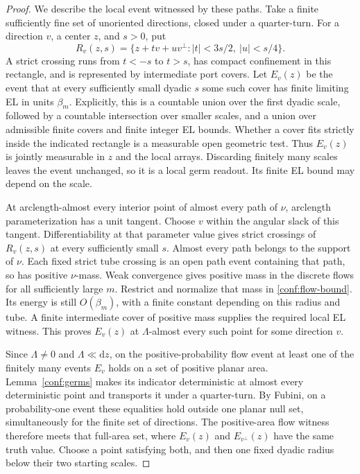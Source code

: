 \documentclass[11pt]{article}
\numberwithin{equation}{section}
\theoremstyle{definition}
\theoremstyle{remark}
\newcommand{\dd}{\mathrm d}
\newcommand{\1}{\mathbf 1}
\begin{document}
\begin{proof}
We describe the local event witnessed by these paths.  Take a finite
sufficiently fine set of unoriented directions, closed under a
quarter-turn.  For a direction \(v\), a center \(z\), and
\(s>0\), put
\[
 R_v(z,s)=\{z+t v+u v^\perp: |t|<3s/2,\ |u|<s/4\}.
\]
A strict crossing runs from \(t<-s\) to \(t>s\), has compact
confinement in this rectangle, and is represented by intermediate
port covers.  Let \(E_v(z)\) be the event that at every sufficiently
small dyadic \(s\) some such cover has finite limiting EL in units
\(\beta_m\).  Explicitly, this is a countable union over the first
dyadic scale, followed by a countable intersection over smaller
scales, and a union over admissible finite covers and finite integer
EL bounds.  Whether a cover fits strictly inside the indicated
rectangle is a measurable open geometric test.  Thus \(E_v(z)\)
is jointly measurable in \(z\) and the local arrays.  Discarding
finitely many scales leaves the event unchanged, so it is a local
germ readout.  Its finite EL bound may depend on the scale.

At arclength-almost every interior point of almost every path of
\(\nu\), arclength parameterization has a unit tangent.  Choose
\(v\) within the angular slack of this tangent.  Differentiability
at that parameter value gives strict crossings of \(R_v(z,s)\)
at every sufficiently small \(s\).  Almost every path belongs to
the support of \(\nu\).  Each fixed strict tube crossing is an
open path event containing that path, so has positive \(\nu\)-mass.
Weak convergence gives positive mass in the discrete flows for all
sufficiently large \(m\).  Restrict and normalize that mass in
\eqref{conf:flow-bound}.  Its energy is still \(O(\beta_m)\), with
a finite constant depending on this radius and tube.  A finite
intermediate cover of positive mass supplies the required local EL
witness.  This proves \(E_v(z)\) at \(\Lambda\)-almost every
such point for some direction \(v\).

Since \(\Lambda\ne0\) and \(\Lambda\ll\dd z\), on the
positive-probability flow event at least one of the finitely many
events \(E_v\) holds on a set of positive planar area.
Lemma~\ref{conf:germs} makes its indicator deterministic at almost
every deterministic point and transports it under a quarter-turn.
By Fubini, on a probability-one event these equalities hold outside
one planar null set, simultaneously for the finite set of directions.
The positive-area flow witness therefore meets that full-area set,
where \(E_v(z)\) and \(E_{v^\perp}(z)\) have the same truth
value.  Choose a point satisfying both, and then one fixed dyadic
radius below their two starting scales.


\end{proof}
\end{document}
